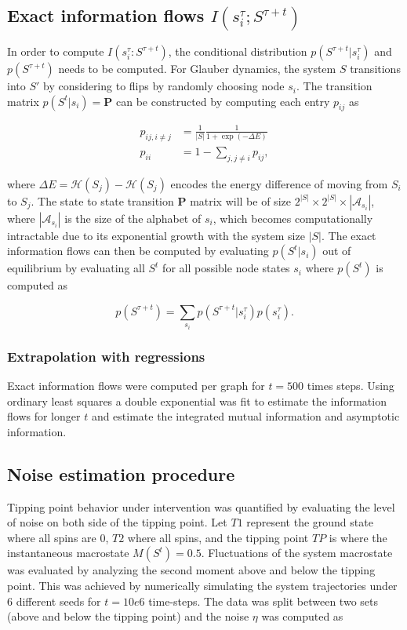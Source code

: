 \documentclass[a4paper, 11pt, twocolumn]{article}
\begin{document}
\subsection{Exact information flows \(I(s_i^{\tau} ; S^{\tau + t})\)}
\label{sec:org59af222}
In  order  to  compute  \(I(s_i^{\tau}  :  S^{\tau + t})\),  the
conditional  distribution \(p(S^{\tau  +  t}  | s_i^{\tau})\)  and
\(p(S^{\tau + t})\) needs to  be computed. For Glauber dynamics,
the system  \(S\) transitions into \(S'\)  by considering to
flips  by randomly  choosing  node  \(s_i\). The  transition
matrix \(p(S^t |  s_i) = \textbf{P}\) can  be constructed by
computing each entry \(p_{ij}\) as

\[\label{eq:glauber}
\begin{split}
p_{ij, i \neq j} &= \frac{1}{|S|} \frac{1}{ 1 + \exp (-\Delta E) }\\
p_{ii} &= 1 - \sum_{j, j \neq i} p_{ij},
\end{split}\]

where \(\Delta E =  \mathcal{H}(S_j) - \mathcal{H}(S_j)\) encodes
the energy difference of moving from \(S_i\) to \(S_j\). The
state to  state transition \(\textbf{P}\) matrix  will be of
size  \(2^{|S|}  \times  2^{|S|} \times  |\mathcal{A}_{s_i}|\),  where
\(|\mathcal{A}_{s_i}|\)  is  the  size of  the  alphabet  of
\(s_i\),  which becomes  computationally intractable  due to
its  exponential growth  with the  system size  \(|S|\). The
exact information  flows can then be  computed by evaluating
\(p(S^t  |  s_i)\)  out  of equilibrium  by  evaluating  all
\(S^t\)  for   all  possible   node  states   \(s_i\)  where
\(p(S^t)\) is computed as

\[p(S^{\tau + t}) = \sum_{s_i} p(S^{\tau + t} | s_i^{\tau} ) p(s_i^{\tau}).\]

\subsubsection{Extrapolation with regressions}
\label{sec:orgabda467}
Exact information  flows were  computed per  graph for  \(t =
500\)  times steps.  Using  ordinary least  squares a  double
exponential was  fit to  estimate the information  flows for
longer \(t\)  and estimate  the integrated  mutual information
and asymptotic information.


\subsection{Noise estimation procedure}
\label{sec:orgc093508}
Tipping point behavior under intervention was quantified by evaluating
the level of noise on both side of the tipping point. Let \(T1\)
represent the ground state where all spins are 0, \(T2\) where all
spins, and the tipping point \(TP\) is where the instantaneous
macrostate \(M(S^t) = 0.5\). Fluctuations of the system macrostate was
evaluated by analyzing the second moment above and below the tipping
point. This was achieved by numerically simulating the system
trajectories under 6 different seeds for \(t = 10e6\) time-steps. The
data was split between two sets (above and below the tipping point) and
the noise \(\eta\) was computed as
\end{document}
